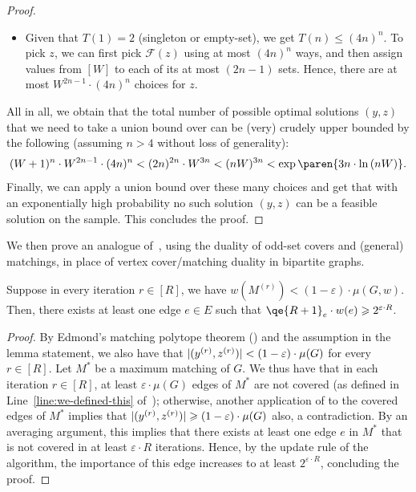 \documentclass{theoretics}
\renewcommand{\leq}{\leqslant}
\renewcommand{\geq}{\geqslant}
\DeclarePairedDelimiter{\paren}()
\DeclarePairedDelimiter{\card}{\vert}{\vert}
\newcommand{\eps}{\varepsilon}
\begin{document}
\begin{proof}
\begin{itemize}[leftmargin=10pt]
\begin{itemize}
			place it anywhere. 
			This leads to $<4n$ options times $T(n-1)$, establishing the claim. 
			\item Given that $T(1) = 2$ (singleton or empty-set), we get $T(n) \leq (4n)^n$. To pick $z$, we can first pick $\mathcal{F}(z)$ using at most $(4n)^n$ ways, and then assign values from $[W]$ to each of its at most $(2n-1)$ sets. Hence,
			there are at most $W^{2n-1} \cdot (4n)^n$ choices for $z$. 
		\end{itemize}
		\end{itemize}
		All in all, we obtain that the total number of possible optimal solutions $(y,z)$ that we need to take a union bound over can be (very) crudely upper bounded by the following (assuming $n > 4$ without loss of generality):   
		\[
			(W+1)^{n} \cdot W^{2n-1} \cdot (4n)^n < (2n)^{2n} \cdot W^{3n} < (nW)^{3n} < \exp\paren{3n \cdot \ln{(nW)}}. 
		\]
		Finally, we can  apply a union bound over these many choices and get that with an exponentially high probability no such solution $(y,z)$ can be a feasible solution on the sample. 
		This concludes the proof. 
\end{proof}
	
We then prove an analogue of~, using the duality of odd-set covers and (general) matchings, in place of vertex cover/matching duality in bipartite graphs. 

\begin{lemma}\label{lem:Qe-large-general}
	Suppose in every iteration $r \in [R]$, we have $w({M^{(r)}}) < (1-\eps) \cdot \mu(G,w)$. Then, 
	there exists at least one edge $e \in E$ such that $\qe{R+1}_e \cdot w(e)  \geq 2^{\eps \cdot R}$.  
\end{lemma}
\begin{proof}
	By Edmond's matching polytope theorem () and the assumption in the lemma statement, we also have that $\card{(y^{(r)},z^{(r)})} < (1-\eps) \cdot \mu(G)$ for every $r \in [R]$. Let $M^*$ be a maximum matching of $G$. 
	We thus have that in each iteration $r \in [R]$, at least $\eps \cdot \mu(G)$ edges of $M^*$ are not covered (as defined in Line~\eqref{line:we-defined-this} of~); otherwise, another application of   to 
	the covered edges of $M^*$ implies that $\card{(y^{(r)},z^{(r)})} \geq (1-\eps) \cdot \mu(G)$ also, a contradiction. By an averaging argument, this implies that there exists at least one edge $e$ in $M^*$ that is not
	covered in at least $\eps \cdot R$ iterations. Hence, by the update rule of the algorithm, the importance of this edge increases to at least $2^{\eps \cdot R}$, concluding the proof. 
\end{proof}
\end{document}
